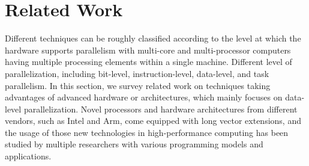 \documentclass[sigconf]{acmart}
\begin{document}
\section{Related Work}\label{sec:related}
Different techniques can be roughly classified according to the level at which
the hardware supports parallelism with multi-core and multi-processor computers having
multiple processing elements within a single machine. Different level of parallelization,
including bit-level, instruction-level, data-level, and task parallelism.
%
In this section, we survey related work on techniques taking advantages of
advanced hardware or architectures, which mainly focuses on data-level parallelization.
Novel processors and hardware architectures from different vendors, such as Intel and Arm,
come equipped with long vector extensions, and the usage of those new technologies in high-performance computing has been
studied by multiple researchers with various programming models and applications.
%
\end{document}
